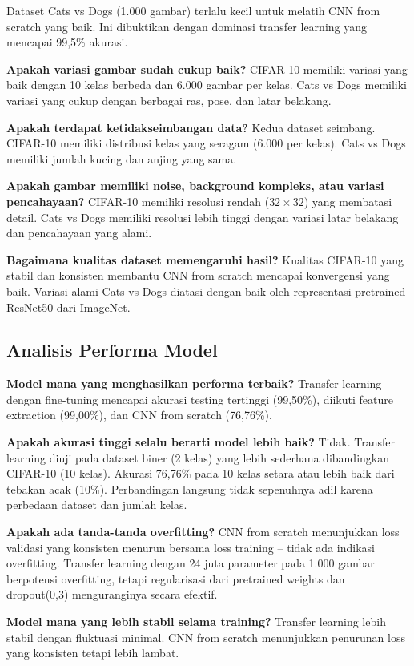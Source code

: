\documentclass[conference]{IEEEtran}
\begin{document}
Dataset Cats vs Dogs (1.000 gambar) terlalu kecil untuk melatih CNN from scratch yang baik. Ini dibuktikan dengan dominasi transfer learning yang mencapai 99,5\% akurasi.

\textbf{Apakah variasi gambar sudah cukup baik?}
CIFAR-10 memiliki variasi yang baik dengan 10 kelas berbeda dan 6.000 gambar per kelas. Cats vs Dogs memiliki variasi yang cukup dengan berbagai ras, pose, dan latar belakang.

\textbf{Apakah terdapat ketidakseimbangan data?}
Kedua dataset seimbang. CIFAR-10 memiliki distribusi kelas yang seragam (6.000 per kelas). Cats vs Dogs memiliki jumlah kucing dan anjing yang sama.

\textbf{Apakah gambar memiliki noise, background kompleks, atau variasi pencahayaan?}
CIFAR-10 memiliki resolusi rendah ($32 \times 32$) yang membatasi detail. Cats vs Dogs memiliki resolusi lebih tinggi dengan variasi latar belakang dan pencahayaan yang alami.

\textbf{Bagaimana kualitas dataset memengaruhi hasil?}
Kualitas CIFAR-10 yang stabil dan konsisten membantu CNN from scratch mencapai konvergensi yang baik. Variasi alami Cats vs Dogs diatasi dengan baik oleh representasi pretrained ResNet50 dari ImageNet.

\subsection{Analisis Performa Model}
\textbf{Model mana yang menghasilkan performa terbaik?}
Transfer learning dengan fine-tuning mencapai akurasi testing tertinggi (99,50\%), diikuti feature extraction (99,00\%), dan CNN from scratch (76,76\%).

\textbf{Apakah akurasi tinggi selalu berarti model lebih baik?}
Tidak. Transfer learning diuji pada dataset biner (2 kelas) yang lebih sederhana dibandingkan CIFAR-10 (10 kelas). Akurasi 76,76\% pada 10 kelas setara atau lebih baik dari tebakan acak (10\%). Perbandingan langsung tidak sepenuhnya adil karena perbedaan dataset dan jumlah kelas.

\textbf{Apakah ada tanda-tanda overfitting?}
CNN from scratch menunjukkan loss validasi yang konsisten menurun bersama loss training -- tidak ada indikasi overfitting. Transfer learning dengan 24 juta parameter pada 1.000 gambar berpotensi overfitting, tetapi regularisasi dari pretrained weights dan dropout(0,3) menguranginya secara efektif.

\textbf{Model mana yang lebih stabil selama training?}
Transfer learning lebih stabil dengan fluktuasi minimal. CNN from scratch menunjukkan penurunan loss yang konsisten tetapi lebih lambat.
\end{document}
